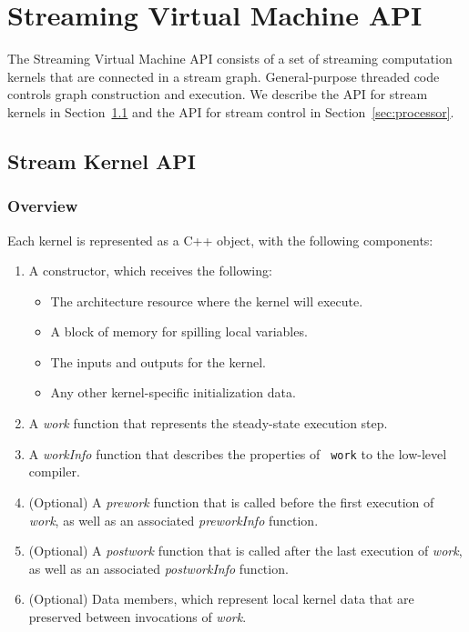 \section{Streaming Virtual Machine API}

The Streaming Virtual Machine API consists of a set of streaming
computation kernels that are connected in a stream graph.
General-purpose threaded code controls graph construction and
execution.  We describe the API for stream kernels in
Section~\ref{sec:kernel} and the API for stream control in
Section~\ref{sec:processor}.

\subsection{Stream Kernel API}
\label{sec:kernel}

\subsubsection{Overview}

Each kernel is represented as a C++ object, with the following
components:

\begin{enumerate}

\item A constructor, which receives the following:

\begin{itemize}
\item The architecture resource where the kernel will execute.
\item A block of memory for spilling local variables.
\item The inputs and outputs for the kernel.
\item Any other kernel-specific initialization data.
\end{itemize}

\item A {\it work} function that represents the steady-state execution
step.

\item A {\it workInfo} function that describes the properties of {\tt
work} to the low-level compiler.

\item (Optional) A {\it prework} function that is called before the
first execution of {\it work}, as well as an associated {\it
preworkInfo} function.

\item (Optional) A {\it postwork} function that is called after the
last execution of {\it work}, as well as an associated {\it
postworkInfo} function.

\item (Optional) Data members, which represent local kernel data that
are preserved between invocations of {\it work}.

\end{enumerate}

